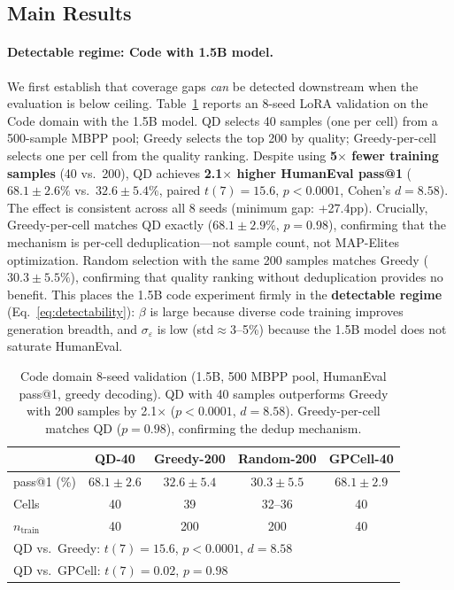 \documentclass{article}
\begin{document}
\begin{enumerate}[nosep]
\subsection{Main Results}

\paragraph{Detectable regime: Code with 1.5B model.}
We first establish that coverage gaps \emph{can} be detected downstream when the evaluation is below ceiling.
Table~\ref{tab:code_8seed} reports an 8-seed LoRA validation on the Code domain with the 1.5B model.
QD selects 40 samples (one per cell) from a 500-sample MBPP pool; Greedy selects the top 200 by quality; Greedy-per-cell selects one per cell from the quality ranking.
Despite using \textbf{5$\times$ fewer training samples} (40 vs.\ 200), QD achieves \textbf{2.1$\times$ higher HumanEval pass@1} ($68.1{\pm}2.6\%$ vs.\ $32.6{\pm}5.4\%$, paired $t(7){=}15.6$, $p{<}0.0001$, Cohen's $d{=}8.58$).
The effect is consistent across all 8 seeds (minimum gap: +27.4pp).
Crucially, Greedy-per-cell matches QD exactly ($68.1{\pm}2.9\%$, $p{=}0.98$), confirming that the mechanism is per-cell deduplication---not sample count, not MAP-Elites optimization.
Random selection with the same 200 samples matches Greedy ($30.3{\pm}5.5\%$), confirming that quality ranking without deduplication provides no benefit.
This places the 1.5B code experiment firmly in the \textbf{detectable regime} (Eq.~\ref{eq:detectability}): $\beta$ is large because diverse code training improves generation breadth, and $\sigma_\varepsilon$ is low (std${\approx}3$--5\%) because the 1.5B model does not saturate HumanEval.

\begin{table}[t]
\centering
\caption{Code domain 8-seed validation (1.5B, 500 MBPP pool, HumanEval pass@1, greedy decoding). QD with 40 samples outperforms Greedy with 200 samples by 2.1$\times$ ($p{<}0.0001$, $d{=}8.58$). Greedy-per-cell matches QD ($p{=}0.98$), confirming the dedup mechanism.}
\label{tab:code_8seed}
\begin{tabular}{lcccc}
\toprule
 & \textbf{QD-40} & \textbf{Greedy-200} & \textbf{Random-200} & \textbf{GPCell-40} \\
\midrule
pass@1 (\%) & $\mathbf{68.1 \pm 2.6}$ & $32.6 \pm 5.4$ & $30.3 \pm 5.5$ & $68.1 \pm 2.9$ \\
Cells & 40 & 39 & 32--36 & 40 \\
$n_{\text{train}}$ & 40 & 200 & 200 & 40 \\
\midrule
\multicolumn{5}{l}{\footnotesize QD vs.\ Greedy: $t(7){=}15.6$, $p{<}0.0001$, $d{=}8.58$} \\
\multicolumn{5}{l}{\footnotesize QD vs.\ GPCell: $t(7){=}0.02$, $p{=}0.98$} \\
\bottomrule
\end{tabular}
\end{table}


\end{enumerate}
\end{document}
